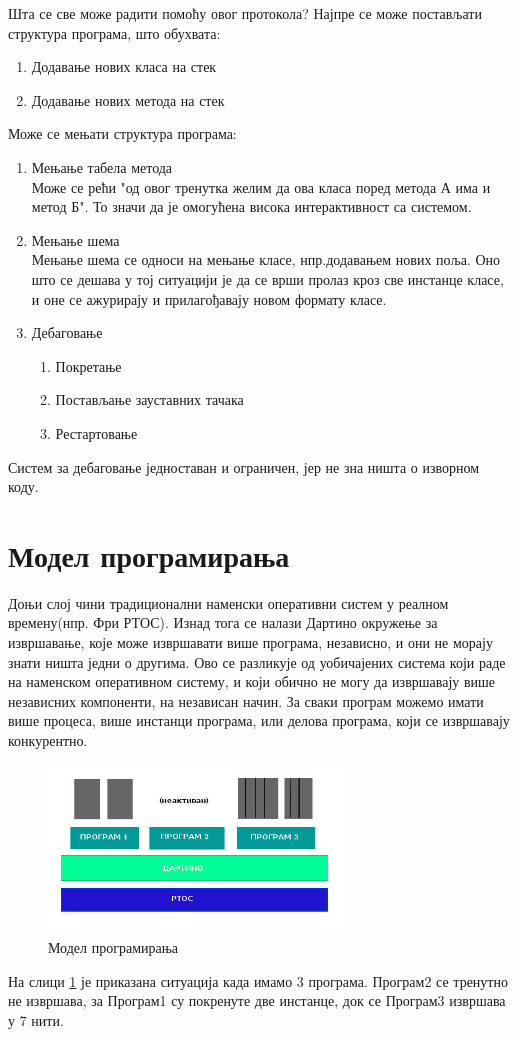 \documentclass[12pt,oneside]{memoir}
\begin{document}
Шта се све може радити помоћу овог протокола? Најпре се може постављати структура програма, што обухвата:
\begin{enumerate}
\item Додавање нових класа на стек
\item Додавање нових метода на стек
\end{enumerate}
Може се мењати структура програма:
\begin{enumerate}
\item Мењање табела метода\\
Може се рећи "од овог тренутка желим да ова класа поред метода А има и метод Б". То значи да је омогућена висока интерактивност са системом.
\item Мењање шема\\
Мењање шема се односи на мењање класе, нпр.додавањем нових поља. Оно што се дешава у тој ситуацији је да се врши пролаз кроз све инстанце класе, и оне се ажурирају и прилагођавају новом формату класе.
\item Дебаговање
\begin{enumerate}
\item Покретање
\item Постављање зауставних тачака
\item Рестартовање
\end{enumerate}
\end{enumerate}
Систем за дебаговање једноставан и ограничен, јер не зна ништа о изворном коду.
\section{Модел програмирања}

Доњи слој чини традиционални наменски оперативни систем у реалном времену(нпр. Фри РТОС). Изнад тога се налази Дартино окружење за извршавање, које може извршавати више програма, независно, и они не морају знати ништа једни о другима. Ово се разликује од уобичајених система који раде на наменском оперативном систему, и који обично не могу да извршавају више независних компоненти, на независан начин. За сваки програм можемо имати више процеса, више инстанци програма, или делова програма, који се извршавају конкурентно.

\begin{figure}[!ht]
  \centering
  \includegraphics[width=0.7\textwidth]{arhitektura.jpg}
  \caption{Модел програмирања}
  \label{fig:model}
\end{figure}
На слици \ref{fig:model} је приказана ситуација када имамо 3 програма. Програм2 се тренутно не извршава, за Програм1 су покренуте две инстанце, док се Програм3  извршава у 7 нити.
\end{document}
